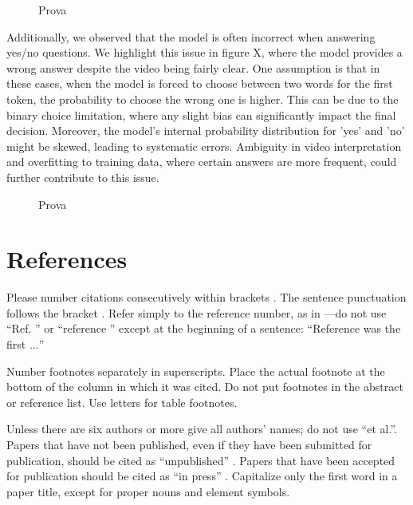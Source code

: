 \documentclass[conference]{IEEEtran}
\begin{document}
\begin{figure}[ht]
  \centering
  \caption{Prova}
  \label{fig:animation}
\end{figure}

Additionally, we observed that the model is often incorrect when answering yes/no questions. We highlight this issue in figure X, where the model provides a wrong answer despite the video being fairly clear. One assumption is that in these cases, when the model is forced to choose between two words for the first token, the probability to choose the wrong one is higher. This can be due to the binary choice limitation, where any slight bias can significantly impact the final decision. Moreover, the model's internal probability distribution for 'yes' and 'no' might be skewed, leading to systematic errors. Ambiguity in video interpretation and overfitting to training data, where certain answers are more frequent, could further contribute to this issue.

\begin{figure}[ht]
  \centering
  \caption{Prova}
  \label{fig:animation}
\end{figure}



\section*{References}

Please number citations consecutively within brackets \cite{b1}. The 
sentence punctuation follows the bracket \cite{b2}. Refer simply to the reference 
number, as in \cite{b3}---do not use ``Ref. \cite{b3}'' or ``reference \cite{b3}'' except at 
the beginning of a sentence: ``Reference \cite{b3} was the first $\ldots$''

Number footnotes separately in superscripts. Place the actual footnote at 
the bottom of the column in which it was cited. Do not put footnotes in the 
abstract or reference list. Use letters for table footnotes.

Unless there are six authors or more give all authors' names; do not use 
``et al.''. Papers that have not been published, even if they have been 
submitted for publication, should be cited as ``unpublished'' \cite{b4}. Papers 
that have been accepted for publication should be cited as ``in press'' \cite{b5}. 
Capitalize only the first word in a paper title, except for proper nouns and 
element symbols.
\end{document}
